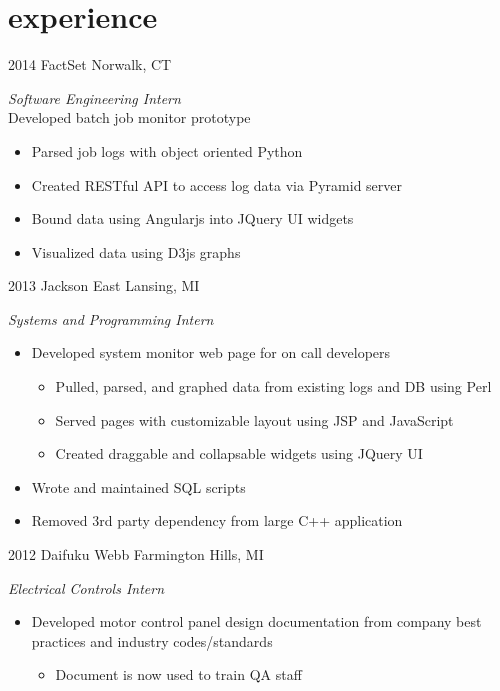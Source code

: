 \section{experience}

\begin{entrylist}
\entry
{2014}
{FactSet}
{Norwalk, CT}
{\emph{Software Engineering Intern}\\
Developed batch job monitor prototype
\begin{itemize}
	\item Parsed job logs with object oriented Python
	\item Created RESTful API to access log data via Pyramid server
	\item Bound data using Angularjs into JQuery UI widgets
	\item Visualized data using D3js graphs
\end{itemize}
}
\entry
{2013}
{Jackson}
{East Lansing, MI}
{\emph{Systems and Programming Intern}
\begin{itemize}
\item Developed system monitor web page for on call developers
	\begin{itemize}
		\item Pulled, parsed, and graphed data from existing logs and DB using Perl
		\item Served pages with customizable layout using JSP and JavaScript
		\item Created draggable and collapsable widgets using JQuery UI
	\end{itemize}
\item Wrote and maintained SQL scripts
\item Removed 3rd party dependency from large C++ application
\end{itemize}
}
\entry
{2012}
{Daifuku Webb}
{Farmington Hills, MI}
{\emph{Electrical Controls Intern}
\begin{itemize}
	\item Developed motor control panel design documentation from company best practices and industry codes/standards
		\begin{itemize}
			\item Document is now used to train QA staff
		\end{itemize}
\end{itemize}
}
\end{entrylist}
